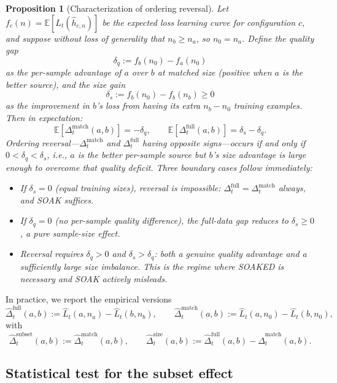 \documentclass{article}
\newtheorem{proposition}{Proposition}
\begin{document}
\begin{proposition}[Characterization of ordering reversal]
\label{prop:reversal}
Let $f_c(n) = \mathbb{E}[L_t(\hat{h}_{c,n})]$ be the expected loss learning curve for configuration $c$, and suppose without loss of generality that $n_b \geq n_a$, so $n_0 = n_a$.
Define the \emph{quality gap}
\[
\delta_q := f_b(n_0) - f_a(n_0)
\]
as the per-sample advantage of $a$ over $b$ at matched size (positive when $a$ is the better source), and the \emph{size gain}
\[
\delta_s := f_b(n_0) - f_b(n_b) \geq 0
\]
as the improvement in $b$'s loss from having its extra $n_b - n_0$ training examples.
Then in expectation:
\[
\mathbb{E}[\Delta_t^{\mathrm{match}}(a,b)] = -\delta_q,
\qquad
\mathbb{E}[\Delta_t^{\mathrm{full}}(a,b)] = \delta_s - \delta_q.
\]
Ordering reversal---$\Delta_t^{\mathrm{match}}$ and $\Delta_t^{\mathrm{full}}$ having opposite signs---occurs if and only if $0 < \delta_q < \delta_s$, i.e., $a$ is the better per-sample source but $b$'s size advantage is large enough to overcome that quality deficit.
Three boundary cases follow immediately:
\begin{itemize}
\item If $\delta_s = 0$ (equal training sizes), reversal is impossible: $\Delta_t^{\mathrm{full}} = \Delta_t^{\mathrm{match}}$ always, and SOAK suffices.
\item If $\delta_q = 0$ (no per-sample quality difference), the full-data gap reduces to $\delta_s \geq 0$, a pure sample-size effect.
\item Reversal requires $\delta_q > 0$ and $\delta_s > \delta_q$: both a genuine quality advantage and a sufficiently large size imbalance. This is the regime where SOAKED is necessary and SOAK actively misleads.
\end{itemize}
\end{proposition}

In practice, we report the empirical versions
\begin{equation}
\widehat{\Delta}_t^{\mathrm{full}}(a,b)
:=
\widehat{L}_t(a,n_a)-\widehat{L}_t(b,n_b),
\qquad
\widehat{\Delta}_t^{\mathrm{match}}(a,b)
:=
\widehat{L}_t(a,n_0)-\widehat{L}_t(b,n_0),
\label{eq:empirical-gaps}
\end{equation}
with
\[
\widehat{\Delta}_t^{\mathrm{subset}}(a,b)
:=
\widehat{\Delta}_t^{\mathrm{match}}(a,b),
\qquad
\widehat{\Delta}_t^{\mathrm{size}}(a,b)
:=
\widehat{\Delta}_t^{\mathrm{full}}(a,b)-\widehat{\Delta}_t^{\mathrm{match}}(a,b).
\]

\subsection{Statistical test for the subset effect}
\label{sec:ttest}
\end{document}
